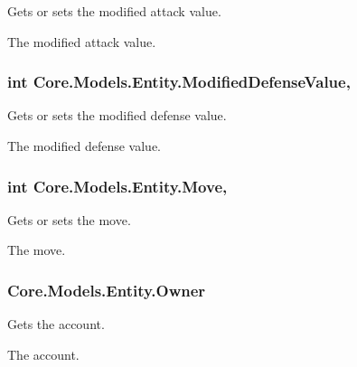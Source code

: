 Gets or sets the modified attack value. 

The modified attack value.\hypertarget{classCore_1_1Models_1_1Entity_a7bb3bab5756906f8202f48d9644fc9aa}{}
\subsubsection[{Modified\+Defense\+Value}]{\setlength{\rightskip}{0pt plus 5cm}int Core.\+Models.\+Entity.\+Modified\+Defense\+Value\hspace{0.3cm}{\ttfamily [get]}, {\ttfamily [set]}}\label{classCore_1_1Models_1_1Entity_a7bb3bab5756906f8202f48d9644fc9aa}


Gets or sets the modified defense value. 

The modified defense value.\hypertarget{classCore_1_1Models_1_1Entity_a3a1f85a3d32a2decd04919d03fb84167}{}
\subsubsection[{Move}]{\setlength{\rightskip}{0pt plus 5cm}int Core.\+Models.\+Entity.\+Move\hspace{0.3cm}{\ttfamily [get]}, {\ttfamily [set]}}\label{classCore_1_1Models_1_1Entity_a3a1f85a3d32a2decd04919d03fb84167}


Gets or sets the move. 

The move.\hypertarget{classCore_1_1Models_1_1Entity_af0d2b689cfd48dc43ad41c49073497df}{}
\subsubsection[{Owner}]{ Core.\+Models.\+Entity.\+Owner\hspace{0.3cm}{\ttfamily [get]}}\label{classCore_1_1Models_1_1Entity_af0d2b689cfd48dc43ad41c49073497df}


Gets the account. 

The account.\hypertarget{classCore_1_1Models_1_1Entity_adf44e0bd8e2a08cf13fcd6a783f783e5}{}
